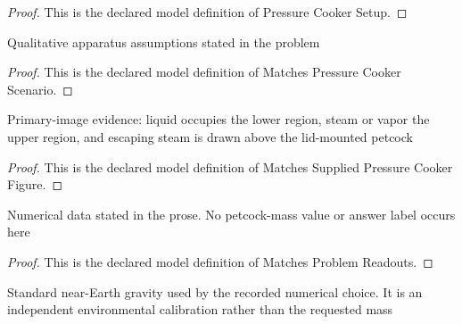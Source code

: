 \begin{proof}
  This is the declared model definition of Pressure Cooker Setup.
\end{proof}
\begin{definition}
  \label{def:physics:phyx-mini-0440:phyxminiproblems-problemphyxmini0440-matchespressurecookerscenario}
  Qualitative apparatus assumptions stated in the problem
\end{definition}
\begin{proof}
  This is the declared model definition of Matches Pressure Cooker Scenario.
\end{proof}
\begin{definition}
  \label{def:physics:phyx-mini-0440:phyxminiproblems-problemphyxmini0440-matchessuppliedpressurecookerfigure}
  Primary-image evidence: liquid occupies the lower region, steam or vapor the upper region, and escaping steam is drawn above the lid-mounted petcock
\end{definition}
\begin{proof}
  This is the declared model definition of Matches Supplied Pressure Cooker Figure.
\end{proof}
\begin{definition}
  \label{def:physics:phyx-mini-0440:phyxminiproblems-problemphyxmini0440-matchesproblemreadouts}
  Numerical data stated in the prose. No petcock-mass value or answer label occurs here
\end{definition}
\begin{proof}
  This is the declared model definition of Matches Problem Readouts.
\end{proof}
\begin{definition}
  \label{def:physics:phyx-mini-0440:phyxminiproblems-problemphyxmini0440-usesstandardnearearthgravity}
  Standard near-Earth gravity used by the recorded numerical choice. It is an independent environmental calibration rather than the requested mass
\end{definition}
